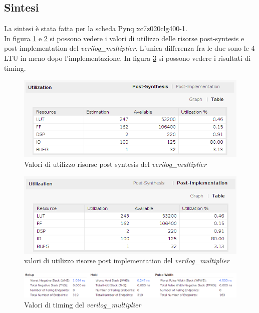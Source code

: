 \documentclass[]{IEEEtran}
\begin{document}
\subsection{Sintesi}
La sintesi è stata fatta per la scheda Pynq xc7z020clg400-1.
\\In figura \ref{fig:UTIL_SYNT_VERILOG} e \ref{fig:UTIL_IMPL_VERILOG} si possono vedere i valori di utilizzo delle risorse post-syntesis e post-implementation del \textit{verilog\_multiplier}. L'unica differenza fra le due sono le 4 LTU in meno dopo l'implementazione. In figura \ref{fig:TIMING_VERILOG} si possono vedere i risultati di timing.
\begin{figure}[!htb]
    \centering
    \includegraphics[width=0.9\linewidth]{figures/util_synt_verilog}
    \caption{Valori di utilizzo risorse post syntesis del \textit{verilog\_multiplier}}
    \label{fig:UTIL_SYNT_VERILOG}
\end{figure}
\begin{figure}[!htb]
    \centering
    \includegraphics[width=0.9\linewidth]{figures/util_impl_verilog}
    \caption{valori di utilizzo risorse post implementation del \textit{verilog\_multiplier}}
    \label{fig:UTIL_IMPL_VERILOG}
\end{figure}
\begin{figure}[!htb]
    \centering
    \includegraphics[width=0.9\linewidth]{figures/timing_verilog}
    \caption{Valori di timing del \textit{verilog\_multiplier}}
    \label{fig:TIMING_VERILOG}
\end{figure}
\end{document}
